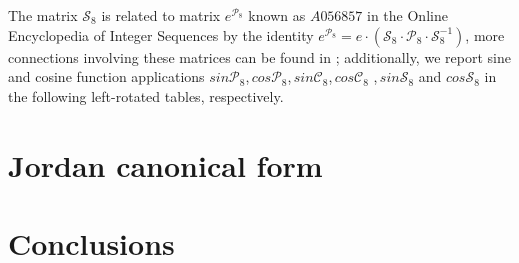 The matrix $\mathcal{S}_{8}$ is related to matrix $e^{\mathcal{P}_{8}}$ known as
$A056857$ in the Online Encyclopedia of Integer Sequences \citep{OEIS} by the
identity $ e^{\mathcal{P}_{8}}=e\cdot\left(\mathcal{S}_{8}\cdot
\mathcal{P}_{8}\cdot \mathcal{S}_{8}^{-1}\right)$, more connections
involving these matrices can be found in \citep{CHEON200149}; additionally, we report
sine and cosine function applications 
$sin{\mathcal{P}_{8}}$,\,$cos{\mathcal{P}_{8}}$,\,$sin{\mathcal{C}_{8}}$,\,$cos{\mathcal{C}_{8}}$
,\,$sin{\mathcal{S}_{8}}$ and $cos{\mathcal{S}_{8}}$
in the following left-rotated tables, respectively.

\vspace*{-1cm}



\section{Jordan canonical form}




\section{Conclusions}








